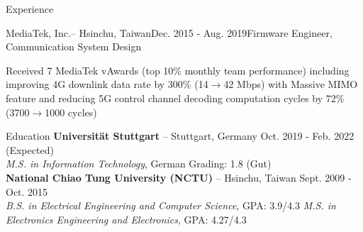 \documentclass{resume} %
\begin{document}
\begin{rSection}{Experience}
\begin{rSubsection}{MediaTek, Inc.}{--  Hsinchu, Taiwan}{Dec. 2015 - Aug. 2019}{Firmware Engineer, Communication System Design}
\item Received 7 MediaTek vAwards (top 10\% monthly team performance) including  improving 4G downlink data rate by 300\% (14$\rightarrow$42 Mbps) with Massive MIMO feature and reducing 5G control channel decoding computation  cycles by 72\% (3700$\rightarrow$1000 cycles)

\end{rSubsection}

\end{rSection}


\begin{rSection}{Education}
{\bf Universität Stuttgart }{--  Stuttgart, Germany}  \hfill {Oct. 2019 - Feb. 2022 (Expected)}\\
{\em M.S. in Information Technology}{, German Grading: 1.8 (Gut) \\ 
{\bf National Chiao Tung University (NCTU) }{--  Hsinchu, Taiwan} \hfill {Sept. 2009 - Oct. 2015}\\
{\em B.S. in Electrical Engineering and Computer Science}{, GPA: 3.9/4.3}
\em M.S. in Electronics Engineering and Electronics}{, GPA: 4.27/4.3} 

\end{rSection}



\end{document}
